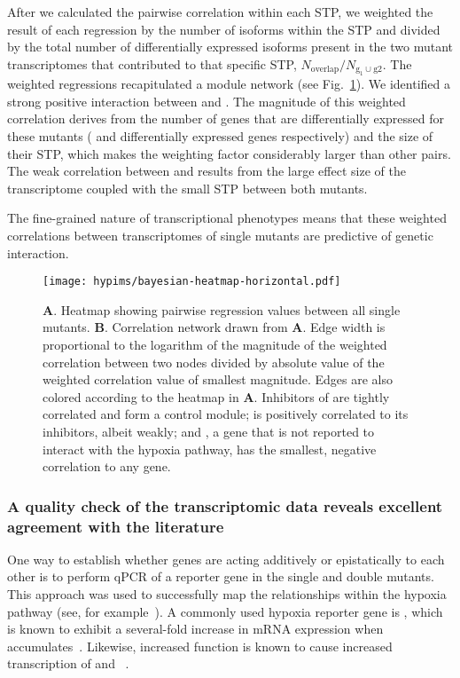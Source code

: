 After we calculated the pairwise correlation within each STP,
we weighted the result of each regression by the
number of isoforms within the STP and
divided by the total number of differentially expressed isoforms present in the
two mutant transcriptomes that contributed to that specific STP,
$N_\mathrm{overlap}/N_{\mathrm{g_1} \cup \mathrm{g2}}$.
The weighted regressions recapitulated a module network (see Fig.~\ref{fig:heatmap}).
We identified a strong positive interaction between \egl{} and \rhy{}.
The magnitude of this weighted correlation derives from the number of genes
that are differentially expressed for these mutants (\egln{} and \rhyn{}
differentially expressed genes respectively) and the size of their STP, which makes
the weighting factor considerably larger than other pairs.
The weak correlation between \hif{} and \egl{} results from the large effect size
of the \egl{} transcriptome coupled with the small STP between both mutants.

The fine-grained nature of transcriptional phenotypes means that these weighted
correlations between transcriptomes of single mutants are predictive of genetic
interaction.

\begin{figure}[tbhp]
\centering
\texttt{[image: hypims/bayesian-heatmap-horizontal.pdf]}
\caption{
\textbf{A}. Heatmap showing pairwise regression values between all
single mutants. \textbf{B}. Correlation network drawn from \textbf{A}. Edge
width is proportional to the logarithm of the magnitude of the weighted
correlation between two nodes divided by absolute value of the weighted
correlation value of smallest magnitude. Edges are also colored according to the
heatmap in \textbf{A}. Inhibitors of  are tightly correlated and form
a control module;
 is positively correlated to its inhibitors, albeit weakly;
and
, a gene that is not reported to interact with the hypoxia pathway,
has the smallest, negative correlation to any gene.
}
\label{fig:heatmap}
\end{figure}

\subsubsection*{A quality check of the transcriptomic data reveals excellent agreement
            with the literature}
\label{sub:quality_check}
One way to establish whether genes are acting additively or epistatically to each
other is to perform qPCR of a reporter gene in the single and double mutants. This
approach was used to successfully map the relationships within the hypoxia
pathway (see, for example~\citep{Shao2009,Shen2006}). A commonly used hypoxia reporter
gene is \nhr{}, which is known to exhibit a several-fold increase in mRNA
expression when \hifp{} accumulates~\citep{Shen2006,Shen2005,Park2012}. Likewise,
increased \hifp{} function is known to cause increased transcription of 
and ~\citep{Powell-Coffman2010}.

